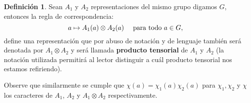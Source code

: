 \documentclass[12pt]{book}
\theoremstyle{definition}
\newtheorem{definition}[theorem]{Definición}
\newcounter{in}
\newcounter{ini}
\begin{document}
\begin{definition}
Sean $A_{1}$ y $A_{2}$ representaciones del mismo grupo digamos $G$, entonces la regla de correspondencia:
\begin{equation*}
a \mapsto A_{1}(a) \otimes A_{2}(a) \quad \textup{ para todo } a \in G,
\end{equation*} 
define una representación que por abuso de notación y de lenguaje también será denotada por $A_{1} \otimes A_{2}$ y será llamada \textbf{producto tensorial} de $A_{1}$ y $A_{2}$ (la notación utilizada permitirá al lector distinguir a cuál producto tensorial nos estamos refiriendo).
\end{definition}
Observe que similarmente se cumple que $\chi (a) = \chi_{1}(a) \chi_{2}(a)$ para $\chi_{1}, \chi_2$ y $\chi$ los caracteres de $A_{1}$, $A_{2}$ y $A_{1} \otimes A_{2}$ respectivamente.
\end{document}

